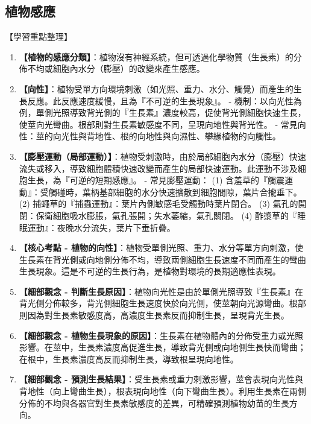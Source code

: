 \documentclass[11pt,a4paper]{article}
\begin{document}
\subsection{植物感應}
\begin{learningpoints}{【學習重點整理】}
\begin{enumerate}[label=\arabic*.]
  \item \textbf{【植物的感應分類】}：植物沒有神經系統，但可透過化學物質（生長素）的分佈不均或細胞內水分（膨壓）的改變來產生感應。
  \item \textbf{【向性】}：植物受單方向環境刺激（如光照、重力、水分、觸覺）而產生的生長反應。此反應速度緩慢，且為『不可逆的生長現象』。
  - 機制：以向光性為例，單側光照導致背光側的『生長素』濃度較高，促使背光側細胞快速生長，使莖向光彎曲。根部則對生長素敏感度不同，呈現向地性與背光性。
  - 常見向性：莖的向光性與背地性、根的向地性與向濕性、攀緣植物的向觸性。
  \item \textbf{【膨壓運動（局部運動）】}：植物受刺激時，由於局部細胞內水分（膨壓）快速流失或移入，導致細胞體積快速改變而產生的局部快速運動。此運動不涉及細胞生長，為『可逆的短期感應』。
  - 常見膨壓運動：
    (1) 含羞草的『觸震運動』：受觸碰時，葉柄基部細胞的水分快速擴散到細胞間隙，葉片合攏垂下。
    (2) 捕蠅草的『捕蟲運動』：葉片內側敏感毛受觸動時葉片閉合。
    (3) 氣孔的開閉：保衛細胞吸水膨脹，氣孔張開；失水萎縮，氣孔關閉。
    (4) 酢漿草的『睡眠運動』：夜晚水分流失，葉片下垂折疊。
  \item \textbf{【核心考點 - 植物的向性】}：植物受單側光照、重力、水分等單方向刺激，使生長素在背光側或向地側分佈不均，導致兩側細胞生長速度不同而產生的彎曲生長現象。這是不可逆的生長行為，是植物對環境的長期適應性表現。
  \item \textbf{【細部觀念 - 判斷生長原因】}：植物向光性是由於單側光照導致『生長素』在背光側分佈較多，背光側細胞生長速度快於向光側，使莖朝向光源彎曲。根部則因為對生長素敏感度高，高濃度生長素反而抑制生長，呈現背光生長。
  \item \textbf{【細部觀念 - 植物生長現象的原因】}：生長素在植物體內的分佈受重力或光照影響。在莖中，生長素濃度高促進生長，導致背光側或向地側生長快而彎曲；在根中，生長素濃度高反而抑制生長，導致根呈現向地性。
  \item \textbf{【細部觀念 - 預測生長結果】}：受生長素或重力刺激影響，莖會表現向光性與背地性（向上彎曲生長），根表現向地性（向下彎曲生長）。利用生長素在兩側分佈的不均與各器官對生長素敏感度的差異，可精確預測植物幼苗的生長方向。
\end{enumerate}
\end{learningpoints}
\end{document}
